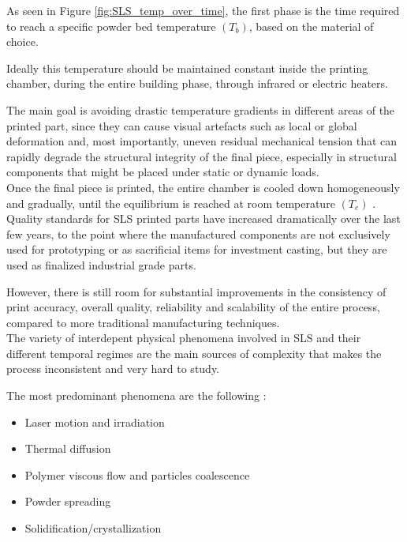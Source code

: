 \documentclass{article}
\begin{document}
    As seen in Figure \ref{fig:SLS_temp_over_time}, the first phase is the time required to reach a specific powder bed temperature $(T_b)$, based on the material of choice. 

    Ideally this temperature should be maintained constant inside the printing
    chamber, during the entire building phase, through infrared or electric heaters. 
    
    The main goal is avoiding drastic temperature gradients in different areas of the printed part, since they can cause 
    visual artefacts such as local or global deformation and, most importantly, uneven residual mechanical tension that can 
    rapidly degrade the structural integrity of the final piece, especially in structural components that might be placed under static or
    dynamic loads. \\ 
    
    Once the final piece is printed, the entire chamber is cooled down homogeneously and gradually, until the equilibrium is reached at room 
    temperature $(T_e)$ \autocite*{Padovano_SLS_Review}. \\ 

    Quality standards for SLS printed parts have increased dramatically over the last few years, to the point where 
    the manufactured components are not exclusively used for prototyping or as sacrificial items for investment casting, but they are 
    used as finalized industrial grade parts. 

    However, there is still room for substantial improvements in the consistency of print accuracy, overall quality, reliability 
    and scalability of the entire process, compared to more traditional manufacturing techniques. \\ 

    The variety of interdepent physical phenomena involved in SLS and their different temporal regimes are the main 
    sources of complexity that makes the process inconsistent and very hard to study. 

    The most predominant phenomena are the following \autocite*{Padovano_SLS_Review}: 

    \begin{itemize}
        \item Laser motion and irradiation
        \item Thermal diffusion
        \item Polymer viscous flow and particles coalescence 
        \item Powder spreading
        \item Solidification/crystallization 
    \end{itemize} 
    
\end{document}
